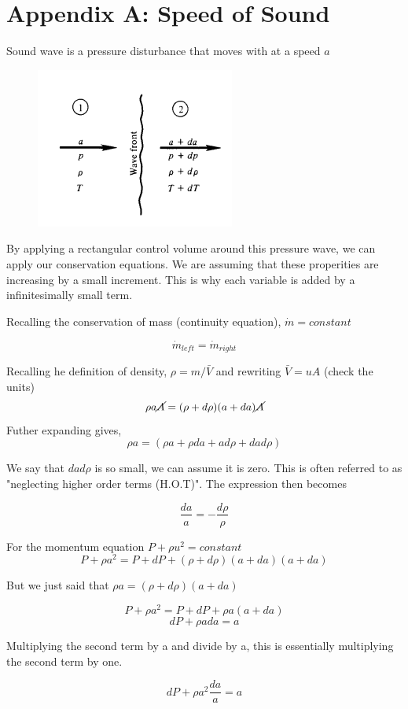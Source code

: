 \section{Appendix A: Speed of Sound}

Sound wave is a pressure disturbance that moves with at a speed $a$

\begin{figure}[h!]
	\centering
	\includegraphics[width=0.3\linewidth]{screenshot001.png}
	\caption{}
	\label{fig:screenshot001}
\end{figure}

By applying a rectangular control volume around this pressure wave, we can apply our conservation equations. We are assuming that these properities are increasing by a small increment. This is why each variable is added by a infinitesimally small term.

Recalling the conservation of mass (continuity equation), $\dot{m} = constant$

\[\dot{m}_{left} = \dot{m}_{right}\]

Recalling he definition of density, $\rho = m/\bar{V}$ and rewriting $\bar{V} = uA$ (check the units)
\[\rho a \cancel{A}  = (\rho + d\rho)(a + da) \cancel{A}\]
Futher expanding gives,
\[\rho a   = (\rho a+ \rho da + a d\rho + da d\rho)\]

We say that $da d\rho$ is so small, we can assume it is zero. This is often referred to as "neglecting higher order terms (H.O.T)". The expression then becomes

\[\frac{da}{a} = -\frac{d \rho}{\rho}\]

For the momentum equation $P + \rho u^2 = constant$
\[P + \rho a^2  = P + dP +  (\rho + d\rho)(a + da)(a + da) \]

But we just said that $\rho a = (\rho + d\rho)(a + da)$


\[P + \rho a^2  = P + dP +  \rho a(a + da) \]
\[dP + \rho ada = a\]

Multiplying the second term by a and divide by a, this is essentially multiplying the second term by one.

\[dP + \rho a^2\frac{da}{a} = a\]

